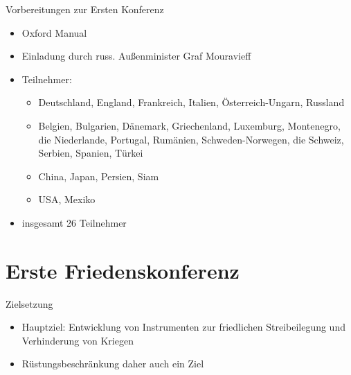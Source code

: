 \documentclass{beamer}
\begin{document}
\begin{frame}{Vorbereitungen zur Ersten Konferenz}
    \begin{itemize}
        \item Oxford Manual
        \item Einladung durch russ. Außenminister Graf Mouravieff
        \item Teilnehmer:
          \begin{itemize}
              \item Deutschland, England, Frankreich, Italien, Österreich-Ungarn, Russland
              \item Belgien, Bulgarien, Dänemark, Griechenland, Luxemburg, Montenegro, die Niederlande, Portugal, Rumänien, Schweden-Norwegen, die Schweiz, Serbien, Spanien, Türkei
              \item China, Japan, Persien, Siam
              \item USA, Mexiko
          \end{itemize}
        \item insgesamt 26 Teilnehmer
    \end{itemize}
\end{frame}

\section{Erste Friedenskonferenz}
\begin{frame}{Zielsetzung}
    \begin{itemize}
        \item Hauptziel: Entwicklung von Instrumenten zur friedlichen Streibeilegung und Verhinderung von Kriegen
        \item Rüstungsbeschränkung daher auch ein Ziel
    \end{itemize}
\end{frame}
\end{document}
